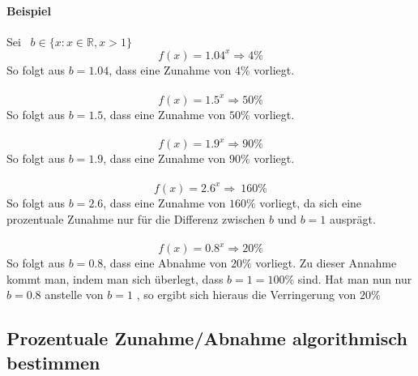 \paragraph{Beispiel} Sei \ $ b \in\{x : x \in \mathbb{R}, x > 1\}$ \
\[f(x)=1.04^x\Rightarrow4\%\]
So folgt aus $b=1.04$, dass eine Zunahme von $4\%$ vorliegt.\\
\\
\[f(x)=1.5^x\Rightarrow50\%\]
So folgt aus $b=1.5$, dass eine Zunahme von $50\%$ vorliegt.\\
\\
\[f(x)=1.9^x\Rightarrow90\%\]
So folgt aus $b=1.9$, dass eine Zunahme von $90\%$ vorliegt.\\
\\
\[f(x)=2.6^x\Rightarrow\ 160\%\]
So folgt aus $b=2.6$, dass eine Zunahme von $160\%$ vorliegt, da sich eine prozentuale Zunahme nur für die Differenz zwischen $b$ und $b=1$ ausprägt.\\
\\
\[f(x)=0.8^x\Rightarrow20\%\]
So folgt aus $b=0.8$, dass eine Abnahme von $20\%$ vorliegt. Zu dieser Annahme kommt man, indem man sich überlegt, dass $b=1=100\%$ sind. Hat man nun nur $b=0.8$ anstelle von $b=1$ , so ergibt sich hieraus die Verringerung von $20\%$
\pagebreak
\subsection{Prozentuale Zunahme/Abnahme algorithmisch bestimmen}\label{sec:Exponentialfunktionen/Prozentuale Zunahme/Abnahme algorithmisch bestimmen}

\pagebreak